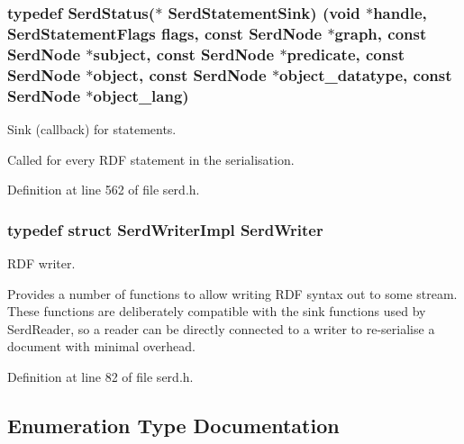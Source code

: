 \subsubsection[{\texorpdfstring{Serd\+Statement\+Sink}{SerdStatementSink}}]{\setlength{\rightskip}{0pt plus 5cm}typedef {\bf Serd\+Status}($\ast$ Serd\+Statement\+Sink) ({\bf void} $\ast$handle, {\bf Serd\+Statement\+Flags} flags, {\bf const} {\bf Serd\+Node} $\ast$graph, {\bf const} {\bf Serd\+Node} $\ast$subject, {\bf const} {\bf Serd\+Node} $\ast${\bf predicate}, {\bf const} {\bf Serd\+Node} $\ast$object, {\bf const} {\bf Serd\+Node} $\ast$object\+\_\+datatype, {\bf const} {\bf Serd\+Node} $\ast$object\+\_\+lang)}\hypertarget{group__serd_ga9cd6dc709f738ed9770d0d2cd1195bd4}{}\label{group__serd_ga9cd6dc709f738ed9770d0d2cd1195bd4}
Sink (callback) for statements.

Called for every R\+DF statement in the serialisation. 

Definition at line 562 of file serd.\+h.

\subsubsection[{\texorpdfstring{Serd\+Writer}{SerdWriter}}]{\setlength{\rightskip}{0pt plus 5cm}typedef struct {\bf Serd\+Writer\+Impl} {\bf Serd\+Writer}}\hypertarget{group__serd_gaaaa09490e19dff0180251f1e2524e6f0}{}\label{group__serd_gaaaa09490e19dff0180251f1e2524e6f0}
R\+DF writer.

Provides a number of functions to allow writing R\+DF syntax out to some stream. These functions are deliberately compatible with the sink functions used by Serd\+Reader, so a reader can be directly connected to a writer to re-\/serialise a document with minimal overhead. 

Definition at line 82 of file serd.\+h.



\subsection{Enumeration Type Documentation}
